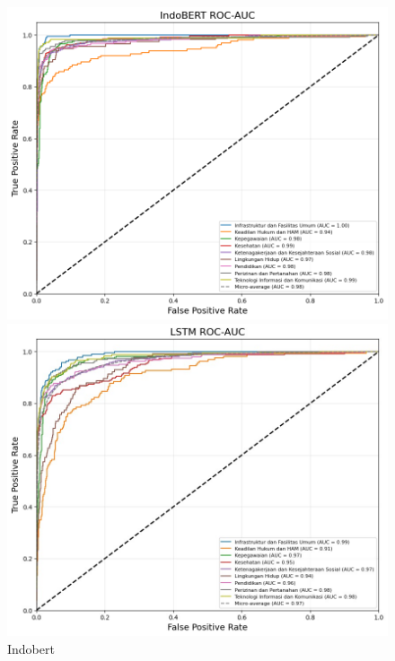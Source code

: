 \documentclass[12pt,a4paper]{article}
\begin{document}
\begin{adjustwidth}
\begin{figure}[H]
    \centering
    \begin{minipage}{0.3\textwidth}
        \centering
        \includegraphics[width=\linewidth]{Image/roc-auc_indobert.png}
        \caption*{Indobert}
        \label{fig:indobert}
    \end{minipage} \hfill
    \begin{minipage}{0.3\textwidth}
        \centering
        \includegraphics[width=\linewidth]{Image/roc-lstm.jpg}

\end{minipage}
\end{figure}
\end{adjustwidth}
\end{document}
